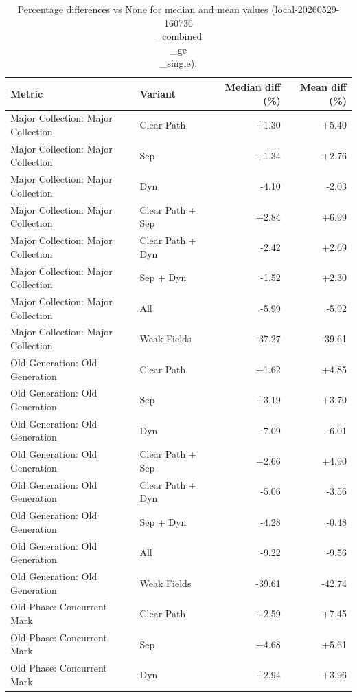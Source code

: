 \begin{table}[t]
\centering
\caption{Percentage differences vs None for median and mean values (local-20260529-160736\\_combined\\_gc\\_single).}
\label{tab:gc_metric_pct_diff_local-20260529-160736\\_combined\\_gc\\_single}
\begin{tabular}{llrr}
\toprule
Metric & Variant & Median diff (\%) & Mean diff (\%) \\
\midrule
Major Collection: Major Collection & Clear Path & +1.30 & +5.40 \\
Major Collection: Major Collection & Sep & +1.34 & +2.76 \\
Major Collection: Major Collection & Dyn & -4.10 & -2.03 \\
Major Collection: Major Collection & Clear Path + Sep & +2.84 & +6.99 \\
Major Collection: Major Collection & Clear Path + Dyn & -2.42 & +2.69 \\
Major Collection: Major Collection & Sep + Dyn & -1.52 & +2.30 \\
Major Collection: Major Collection & All & -5.99 & -5.92 \\
Major Collection: Major Collection & Weak Fields & -37.27 & -39.61 \\
Old Generation: Old Generation & Clear Path & +1.62 & +4.85 \\
Old Generation: Old Generation & Sep & +3.19 & +3.70 \\
Old Generation: Old Generation & Dyn & -7.09 & -6.01 \\
Old Generation: Old Generation & Clear Path + Sep & +2.66 & +4.90 \\
Old Generation: Old Generation & Clear Path + Dyn & -5.06 & -3.56 \\
Old Generation: Old Generation & Sep + Dyn & -4.28 & -0.48 \\
Old Generation: Old Generation & All & -9.22 & -9.56 \\
Old Generation: Old Generation & Weak Fields & -39.61 & -42.74 \\
Old Phase: Concurrent Mark & Clear Path & +2.59 & +7.45 \\
Old Phase: Concurrent Mark & Sep & +4.68 & +5.61 \\
Old Phase: Concurrent Mark & Dyn & +2.94 & +3.96 \\

\end{tabular}
\end{table}
